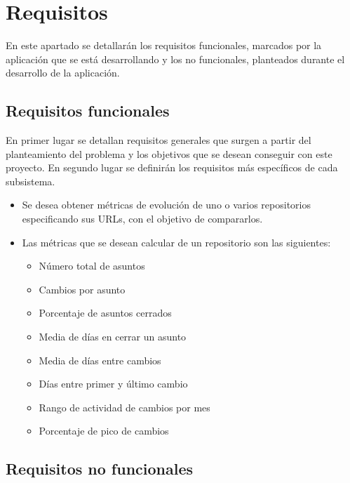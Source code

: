 
\section{Requisitos}
En este apartado se detallarán los requisitos funcionales, marcados por la aplicación que se está desarrollando y los no funcionales, planteados durante el desarrollo de la aplicación.
\subsection{Requisitos funcionales}
En primer lugar se detallan requisitos generales que surgen a partir del planteamiento del problema y los objetivos que se desean conseguir con este proyecto. En segundo lugar se definirán los requisitos más específicos de cada subsistema.
\begin{itemize}
	\item Se desea obtener métricas de evolución de uno o varios repositorios especificando sus URLs, con el objetivo de compararlos.
	\item Las métricas que se desean calcular de un repositorio son las siguientes:
	\begin{itemize}
		\item Número total de asuntos
		\item Cambios por asunto
		\item Porcentaje de asuntos cerrados
		\item Media de días en cerrar un asunto
		\item Media de días entre cambios
		\item Días entre primer y último cambio
		\item Rango de actividad de cambios por mes
		\item Porcentaje de pico de cambios
	\end{itemize}
\end{itemize}
\subsection{Requisitos no funcionales}